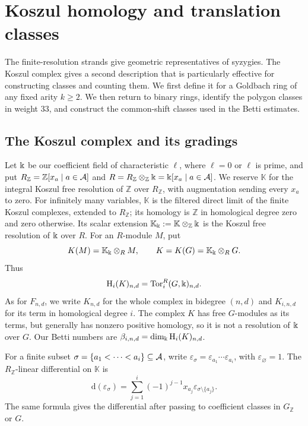\section{Koszul homology and translation classes}
\label{sec:koszul}

The finite-resolution strands give geometric representatives of
syzygies. The Koszul complex gives a second description that is
particularly effective for constructing classes and counting them.
We first define it for a Goldbach ring of any fixed arity $k\ge2$.
We then return to binary rings, identify the polygon classes in
weight $33$, and construct the common-shift classes used in the
Betti estimates.

\subsection{The Koszul complex and its gradings}
Let $\Bbbk$ be our coefficient field of characteristic $\ell$, where
$\ell=0$ or $\ell$ is prime, and put
$R_{\mathbb Z}=\mathbb Z[x_a\mid a\in\mathcal A]$ and
$R=R_{\mathbb Z}\otimes_{\mathbb Z}\Bbbk=\Bbbk[x_a\mid a\in\mathcal A]$.
We reserve $\mathbb K$ for the integral Koszul free resolution of
$\mathbb Z$ over $R_{\mathbb Z}$, with augmentation sending every
$x_a$ to zero. For infinitely many variables, $\mathbb K$ is the
filtered direct limit of the finite Koszul complexes, extended to
$R_{\mathbb Z}$; its homology is $\mathbb Z$ in homological degree
zero and zero otherwise.
Its scalar extension
$\mathbb K_{\Bbbk}:=\mathbb K\otimes_{\mathbb Z}\Bbbk$
is the Koszul free resolution of $\Bbbk$ over $R$.
For an $R$-module $M$, put
\[
 K(M)=\mathbb K_{\Bbbk}\otimes_R M,\qquad
 K=K(G)=\mathbb K_{\Bbbk}\otimes_R G.
\]
Thus
\[
 \mathrm{H}_i(K)_{n,d}=\operatorname{Tor}_i^R(G,\Bbbk)_{n,d}.
\]
As for $F_{n,d}$, we write $K_{n,d}$ for the whole complex in
bidegree $(n,d)$ and $K_{i,n,d}$ for its term in homological degree $i$.
The complex $K$ has free $G$-modules as its terms, but generally has
nonzero positive homology, so it is not a resolution of $\Bbbk$ over $G$.
Our Betti numbers are
$\beta_{i,n,d}=\dim_\Bbbk\mathrm{H}_i(K)_{n,d}$.

For a finite subset $\sigma=\{a_1<\cdots<a_i\}\subseteq\mathcal A$, write
$\varepsilon_\sigma=\varepsilon_{a_1}\cdots\varepsilon_{a_i}$, with
$\varepsilon_\varnothing=1$. The $R_{\mathbb Z}$-linear differential
on $\mathbb K$ is
\begin{equation}\label{setup:koszul-differential}
 \mathrm{d}(\varepsilon_\sigma)=
 \sum_{j=1}^i(-1)^{j-1}x_{a_j}\varepsilon_{\sigma\setminus\{a_j\}}.
\end{equation}
The same formula gives the differential after passing to coefficient
classes in $G_{\mathbb Z}$ or $G$.

